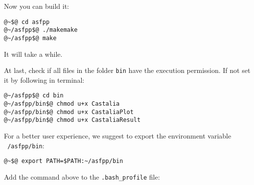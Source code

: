 Now you can build it:
%
\begin{lstlisting}[language={terminal}]
@~$@ cd asfpp
@~/asfpp$@ ./makemake
@~/asfpp$@ make
\end{lstlisting}
%
It will take a while.

At last, check if all files in the folder \texttt{bin} have the execution permission. If not set it by following in terminal:
\begin{lstlisting}[language={terminal}]
@~/asfpp$@ cd bin 
@~/asfpp/bin$@ chmod u+x Castalia
@~/asfpp/bin$@ chmod u+x CastaliaPlot
@~/asfpp/bin$@ chmod u+x CastaliaResult
\end{lstlisting}

For a better user experience, we suggest to export the environment variable \texttt{~/asfpp/bin}:
%
\begin{lstlisting}[language={terminal}]
@~$@ export PATH=$PATH:~/asfpp/bin
\end{lstlisting}
%
Add the command above to the \texttt{.bash\_profile} file:
